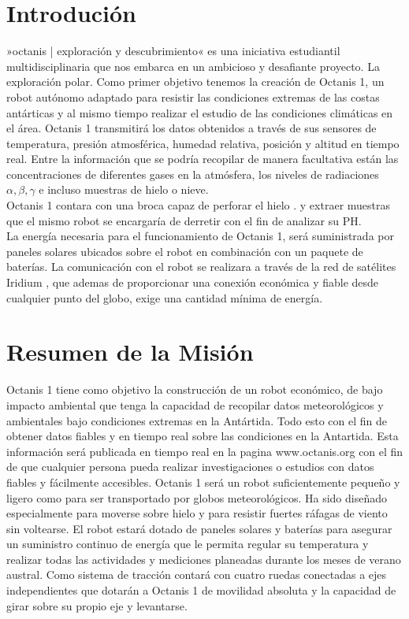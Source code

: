 \documentclass[a4paper,12pt]{article}
\begin{document}
\tableofcontents

\pagebreak

\section{Introdución}
»octanis | exploración y descubrimiento« \cite{octanis} es una iniciativa estudiantil multidisciplinaria que nos embarca en un ambicioso y desafiante proyecto. La exploración polar. Como primer objetivo tenemos la creación de Octanis 1, un robot autónomo adaptado para resistir las condiciones extremas de las costas antárticas y al mismo tiempo realizar el estudio de las condiciones climáticas en el área. 
Octanis 1 transmitirá los datos obtenidos a través de sus sensores de temperatura, presión atmosférica, humedad relativa, posición y altitud en tiempo real.  Entre la información que se podría recopilar de manera facultativa están las concentraciones de diferentes gases en la atmósfera, los niveles de radiaciones $\alpha, \beta, \gamma$ e incluso muestras de hielo o nieve.  \\ Octanis 1 contara con una broca capaz de perforar el hielo \cite{krishnakant}. y extraer muestras que el mismo robot se encargaría de derretir con el fin de analizar su PH.
\\ La energía necesaria para el funcionamiento de Octanis 1, será suministrada por paneles solares ubicados sobre el robot en combinación con un paquete de baterías. La comunicación con el robot se realizara a través de la red de satélites Iridium  \cite{iridium}, que ademas de proporcionar una conexión económica y fiable desde cualquier punto del globo, exige una cantidad mínima de energía.


\section{Resumen de la Misión}

Octanis 1 tiene como objetivo la construcción de un robot económico, de bajo impacto ambiental que tenga la capacidad de recopilar datos meteorológicos y ambientales bajo condiciones extremas en la Antártida. Todo esto con el fin de obtener datos fiables y en tiempo real sobre las condiciones en la Antartida. Esta información será publicada en tiempo real en la pagina www.octanis.org con el fin de que cualquier persona pueda realizar investigaciones o estudios con datos fiables y fácilmente accesibles.
Octanis 1 será un robot suficientemente pequeño y ligero como para ser transportado por globos meteorológicos. Ha sido diseñado especialmente para moverse sobre hielo y para resistir fuertes ráfagas de viento sin voltearse. El robot estará dotado de paneles solares y baterías para asegurar un suministro continuo de energía que le permita regular su temperatura y realizar todas las actividades y mediciones planeadas durante los meses de verano austral. Como sistema de tracción contará con cuatro ruedas conectadas a ejes independientes que dotarán a Octanis 1 de movilidad absoluta y la capacidad de girar sobre su propio eje y levantarse.
\end{document}
